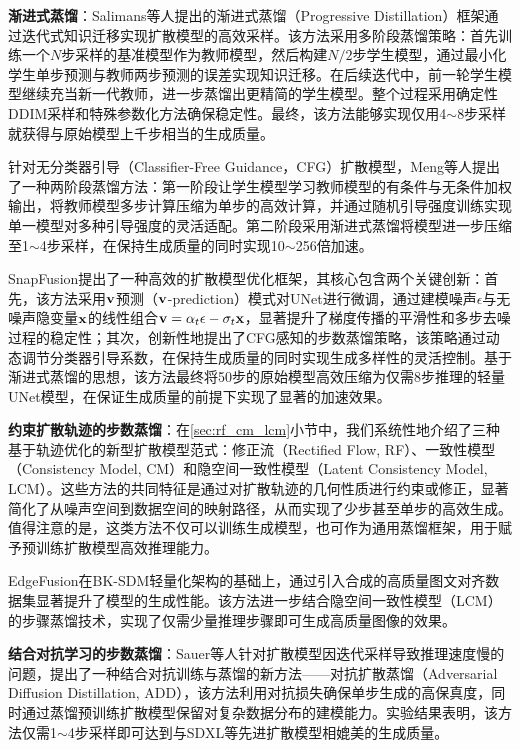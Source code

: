 \documentclass[11pt,a4paper,UTF8]{ctexart}
\begin{document}
\textbf{渐进式蒸馏}：Salimans等人\cite{salimans2021progressive}提出的渐进式蒸馏（Progressive Distillation）框架通过迭代式知识迁移实现扩散模型的高效采样。该方法采用多阶段蒸馏策略：首先训练一个$N$步采样的基准模型作为教师模型，然后构建$N/2$步学生模型，通过最小化学生单步预测与教师两步预测的误差实现知识迁移。在后续迭代中，前一轮学生模型继续充当新一代教师，进一步蒸馏出更精简的学生模型。整个过程采用确定性DDIM\cite{song2020denoising}采样和特殊参数化方法确保稳定性。最终，该方法能够实现仅用4$\sim$8步采样就获得与原始模型上千步相当的生成质量。

针对无分类器引导（Classifier-Free Guidance，CFG）扩散模型，Meng等人\cite{meng2022distillation}提出了一种两阶段蒸馏方法：第一阶段让学生模型学习教师模型的有条件与无条件加权输出，将教师模型多步计算压缩为单步的高效计算，并通过随机引导强度训练实现单一模型对多种引导强度的灵活适配。第二阶段采用渐进式蒸馏\cite{salimans2021progressive}将模型进一步压缩至1$\sim$4步采样，在保持生成质量的同时实现10$\sim$256倍加速。

SnapFusion\cite{li2023snapfusion}提出了一种高效的扩散模型优化框架，其核心包含两个关键创新：首先，该方法采用$\mathbf{v}$预测（$\mathbf{v}$-prediction）模式对UNet进行微调，通过建模噪声$\epsilon$与无噪声隐变量$\mathbf{x}$的线性组合$\mathbf{v}=\alpha_t\epsilon-\sigma_t\mathbf{x}$，显著提升了梯度传播的平滑性和多步去噪过程的稳定性；其次，创新性地提出了CFG感知的步数蒸馏策略，该策略通过动态调节分类器引导系数，在保持生成质量的同时实现生成多样性的灵活控制。基于渐进式蒸馏的思想，该方法最终将50步的原始模型高效压缩为仅需8步推理的轻量UNet模型，在保证生成质量的前提下实现了显著的加速效果。

\textbf{约束扩散轨迹的步数蒸馏}：在\ref{sec:rf_cm_lcm}小节中，我们系统性地介绍了三种基于轨迹优化的新型扩散模型范式：修正流（Rectified Flow, RF）\cite{liu2022flow}、一致性模型（Consistency Model, CM）\cite{pmlr-v202-song23a}和隐空间一致性模型（Latent Consistency Model, LCM）\cite{luo2023latent}。这些方法的共同特征是通过对扩散轨迹的几何性质进行约束或修正，显著简化了从噪声空间到数据空间的映射路径，从而实现了少步甚至单步的高效生成。值得注意的是，这类方法不仅可以训练生成模型，也可作为通用蒸馏框架，用于赋予预训练扩散模型高效推理能力。

EdgeFusion\cite{castells2024edgefusion}在BK-SDM轻量化架构的基础上，通过引入合成的高质量图文对齐数据集显著提升了模型的生成性能。该方法进一步结合隐空间一致性模型（LCM）的步骤蒸馏技术，实现了仅需少量推理步骤即可生成高质量图像的效果。

\textbf{结合对抗学习的步数蒸馏}：Sauer等人\cite{sauer2024adversarial}针对扩散模型因迭代采样导致推理速度慢的问题，提出了一种结合对抗训练与蒸馏的新方法——对抗扩散蒸馏（Adversarial Diffusion Distillation, ADD），该方法利用对抗损失确保单步生成的高保真度，同时通过蒸馏预训练扩散模型保留对复杂数据分布的建模能力。实验结果表明，该方法仅需1$\sim$4步采样即可达到与SDXL\cite{podell2023sdxl}等先进扩散模型相媲美的生成质量。
\end{document}

